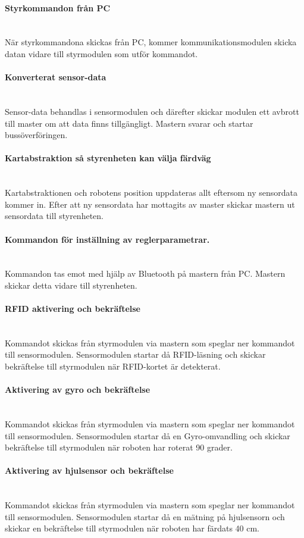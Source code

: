\documentclass[a4paper,12pt,fleqn]{article}
\begin{document}
\paragraph{Styrkommandon från PC}
~\\
När styrkommandona skickas från PC, kommer kommunikationsmodulen skicka datan vidare till styrmodulen som utför kommandot.
\paragraph{Konverterat sensor-data}
~\\
Sensor-data behandlas i sensormodulen och därefter skickar modulen ett avbrott till master om att data finns tillgängligt. Mastern svarar och startar bussöverföringen.
\paragraph{Kartabstraktion så styrenheten kan välja färdväg}
~\\
Kartabstraktionen och robotens position uppdateras allt eftersom ny sensordata kommer in. Efter att ny sensordata har mottagits av master skickar mastern ut sensordata till styrenheten.
\paragraph{Kommandon för inställning av reglerparametrar.}
~\\
Kommandon tas emot med hjälp av Bluetooth på mastern från PC. Mastern skickar detta vidare till styrenheten. 
\paragraph{RFID aktivering och bekräftelse}
~\\
Kommandot skickas från styrmodulen via mastern som speglar ner kommandot till sensormodulen. Sensormodulen startar då RFID-läsning och skickar bekräftelse till styrmodulen när RFID-kortet är detekterat.  

\paragraph{Aktivering av gyro och bekräftelse}
~\\
Kommandot skickas från styrmodulen via mastern som speglar ner kommandot till sensormodulen. Sensormodulen startar då en Gyro-omvandling och skickar bekräftelse till styrmodulen när roboten har roterat 90 grader. 

\paragraph{Aktivering av hjulsensor och bekräftelse}
~\\
Kommandot skickas från styrmodulen via mastern som speglar ner kommandot till sensormodulen. Sensormodulen startar då en mätning på hjulsensorn och skickar en bekräftelse till styrmodulen när roboten har färdats 40 cm. 
\end{document}
